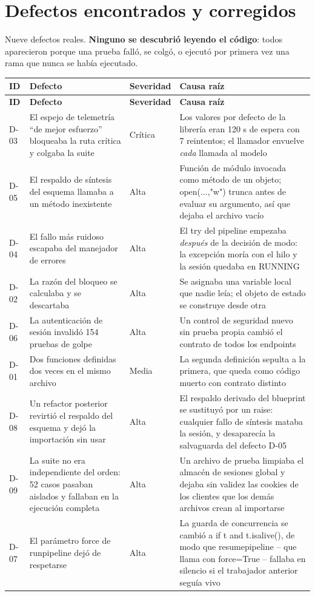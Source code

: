 \documentclass[11pt,a4paper]{article}
\newcommand{\code}[1]{{\ttfamily\small\def\_{\textunderscore\allowbreak}#1}}
\begin{document}
\section{Defectos encontrados y corregidos}
\label{sec:defectos}

Nueve defectos reales. \textbf{Ninguno se descubrió leyendo el código}: todos aparecieron porque
una prueba falló, se colgó, o ejecutó por primera vez una rama que nunca se había ejecutado.

\begin{longtable}{p{1.1cm} p{5.6cm} p{1.9cm} p{6.0cm}}
\toprule
\textbf{ID} & \textbf{Defecto} & \textbf{Severidad} & \textbf{Causa raíz} \\ \midrule
\endfirsthead
\toprule \textbf{ID} & \textbf{Defecto} & \textbf{Severidad} & \textbf{Causa raíz} \\ \midrule \endhead
D-03 & El espejo de telemetría ``de mejor esfuerzo'' bloqueaba la ruta crítica y colgaba la suite & Crítica & Los valores por defecto de la librería eran 120 s de espera con 7 reintentos; el llamador envuelve \emph{cada} llamada al modelo \\
D-05 & El respaldo de síntesis del esquema llamaba a un método inexistente & Alta & Función de módulo invocada como método de un objeto; \code{open(...,"w")} trunca antes de evaluar su argumento, así que dejaba el archivo vacío \\
D-04 & El fallo más ruidoso escapaba del manejador de errores & Alta & El \code{try} del pipeline empezaba \emph{después} de la decisión de modo: la excepción moría con el hilo y la sesión quedaba en \code{RUNNING} \\
D-02 & La razón del bloqueo se calculaba y se descartaba & Alta & Se asignaba una variable local que nadie leía; el objeto de estado se construye desde otra \\
D-06 & La autenticación de sesión invalidó 154 pruebas de golpe & Alta & Un control de seguridad nuevo sin prueba propia cambió el contrato de todos los endpoints \\
D-01 & Dos funciones definidas dos veces en el mismo archivo & Media & La segunda definición sepulta a la primera, que queda como código muerto con contrato distinto \\
D-08 & Un refactor posterior revirtió el respaldo del esquema y dejó la importación sin usar & Alta & El respaldo derivado del blueprint se sustituyó por un \code{raise}: cualquier fallo de síntesis mataba la sesión, y desaparecía la salvaguarda del defecto D-05 \\
D-09 & La suite no era independiente del orden: 52 casos pasaban aislados y fallaban en la ejecución completa & Alta & Un archivo de prueba limpiaba el almacén de sesiones global y dejaba sin validez las cookies de los clientes que los demás archivos crean al importarse \\
D-07 & El parámetro \code{force} de \code{run\_pipeline} dejó de respetarse & Alta & La guarda de concurrencia se cambió a \code{if t and t.is\_alive()}, de modo que \code{resume\_pipeline} -- que llama con \code{force=True} -- fallaba en silencio si el trabajador anterior seguía vivo \\
\bottomrule
\end{longtable}
\end{document}
